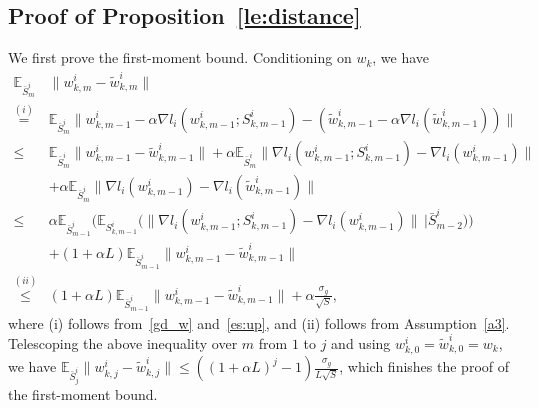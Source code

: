\documentclass{osudissert96}
\begin{document}
\subsection*{Proof of Proposition~\ref{le:distance}}	
	We first prove the first-moment bound. 
	Conditioning on $w_k$, we have 
	\begin{align*}
	\mathbb{E}_{\bar S^i_m}&\|w_{k,m}^i - \widetilde w_{k,m}^i\| 
	\\\overset{(i)}=& \mathbb{E}_{\bar S^i_m}\big\|w_{k,m-1}^i - \alpha \nabla l_i(w_{k,m-1}^i; S_{k,m-1}^i) - (\widetilde w_{k,m-1}^i - \alpha \nabla l_i(\widetilde w_{k,m-1}^i) )\big\|  \nonumber
	\\ \leq& \mathbb{E}_{\bar S^i_m} \|w_{k,m-1}^i - \widetilde w_{k,m-1}^i\| + \alpha \mathbb{E}_{\bar S^i_m}\big\|\nabla l_i(w_{k,m-1}^i; S_{k,m-1}^i) - \nabla l_i(w_{k,m-1}^i)\big\|\nonumber
	\\ &+ \alpha \mathbb{E}_{\bar S^i_m}\big\| \nabla l_i(w_{k,m-1}^i) - \nabla l_i(\widetilde w_{k,m-1}^i) \big\| \nonumber
	\\ \leq & \alpha \mathbb{E}_{\bar S^i_{m-1}} \Big(      \mathbb{E}_{S_{k,m-1}^i} \big(\|\nabla l_i(w_{k,m-1}^i; S_{k,m-1}^i) - \nabla l_i(w_{k,m-1}^i)\big\| \,\Big | \bar S^i_{m-2}\big)\Big)    \nonumber
	\\ & + (1+\alpha L)  \mathbb{E}_{\bar S^i_{m-1}} \|w_{k,m-1}^i - \widetilde w_{k,m-1}^i\| \nonumber
	\\\overset{(ii)}\leq & (1+\alpha L)  \mathbb{E}_{\bar S^i_{m-1}} \|w_{k,m-1}^i - \widetilde w_{k,m-1}^i\|  +  \alpha\frac{\sigma_g}{\sqrt{S}},\nonumber
	\end{align*}
	where (i) follows from~\cref{gd_w} and~\cref{es:up}, and (ii) follows from Assumption~\ref{a3}. 
	Telescoping the above inequality over $m$ from $1$ to $j$ and using  $w_{k,0}^i = \widetilde w_{k,0}^i = w_k$, we have 
	$\mathbb{E}_{\bar S^i_j}\|w_{k,j}^i - \widetilde w_{k,j}^i\|  \leq ((1+\alpha L)^j-1) \frac{\sigma_g}{L\sqrt{S}}$,
	which finishes the proof of the first-moment bound. 
	
\end{document}
